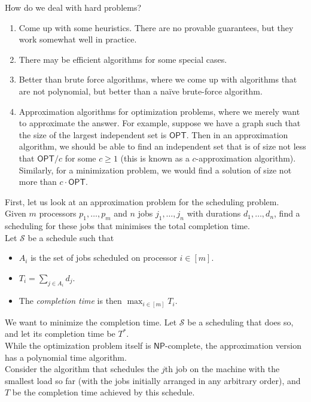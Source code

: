 	How do we deal with hard problems?
	\begin{enumerate}
		\item Come up with some heuristics. There are no provable guarantees, but they work somewhat well in practice.
		\item There may be efficient algorithms for some special cases.
		\item Better than brute force algorithms, where we come up with algorithms that are not polynomial, but better than a na\"{i}ve brute-force algorithm.
		\item Approximation algorithms for optimization problems, where we merely want to approximate the answer. For example, suppose we have a graph such that the size of the largest independent set is $\mathsf{OPT}$. Then in an approximation algorithm, we should be able to find an independent set that is of size not less that $\mathsf{OPT}/c$ for some $c \geq 1$ (this is known as a $c$-approximation algorithm). Similarly, for a minimization problem, we would find a solution of size not more than $c\cdot\mathsf{OPT}$.
	\end{enumerate}
	
	First, let us look at an approximation problem for the scheduling problem.\\
	Given $m$ processors $p_1,\ldots,p_m$ and $n$ jobs $j_1,\ldots,j_n$ with durations $d_1,\ldots,d_n$, find a scheduling for these jobs that minimises the total completion time.\\
	Let $\mathcal{S}$ be a schedule such that
	\begin{itemize}
		\item $A_i$ is the set of jobs scheduled on processor $i\in[m]$.
		\item $T_i = \sum_{j \in A_i} d_j$.
		\item The \textit{completion time} is then $\max_{i \in [m]} T_i$.
	\end{itemize}
	We want to minimize the completion time. Let $\mathcal{S}$ be a scheduling that does so, and let its completion time be $T^*$.\\ 
	While the optimization problem itself is $\mathsf{NP}$-complete, the approximation version has a polynomial time algorithm.\\
	Consider the algorithm that schedules the $j$th job on the machine with the smallest load so far (with the jobs initially arranged in any arbitrary order), and $T$ be the completion time achieved by this schedule.

